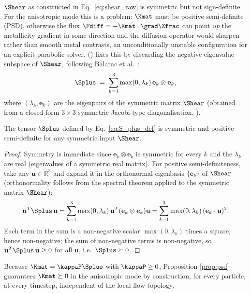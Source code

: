 $\Shear$ as constructed in Eq.~\eqref{eq:shear_raw} is symmetric but not
sign-definite. For the anisotropic mode this is a problem: $\Kmat$ must
be positive semi-definite (PSD), otherwise the flux $\Fdiff = -\Kmat
\cdot\grad\Zfrac$ can point \emph{up} the metallicity gradient in some
direction and the diffusion operator would sharpen rather than smooth
metal contrasts, an unconditionally unstable configuration for an
explicit parabolic solver. 
() fixes this by discarding the
negative-eigenvalue subspace of $\Shear$, following Balarac et
al.~\cite{Balarac2013}:
\begin{equation}
  \label{eq:S_plus_def}
  \Splus \;=\; \sum_{k=1}^{3} \max(0,\lambda_k)\, \mathbf e_k \otimes \mathbf e_k ,
\end{equation}
where $(\lambda_k, \mathbf e_k)$ are the eigenpairs of the symmetric
matrix $\Shear$ (obtained from a closed-form $3\times3$ symmetric
Jacobi-type diagonalisation, ).

\begin{proposition}
\label{prop:psd}
The tensor $\Splus$ defined by Eq.~\eqref{eq:S_plus_def} is symmetric
and positive semi-definite for any symmetric input $\Shear$.
\end{proposition}
\begin{proof}
Symmetry is immediate since $\mathbf e_k\otimes\mathbf e_k$ is symmetric
for every $k$ and the $\lambda_k$ are real (eigenvalues of a symmetric
real matrix). For positive semi-definiteness, take any
$\mathbf u \in \mathbb R^3$ and expand it in the orthonormal eigenbasis
$\{\mathbf e_k\}$ of $\Shear$ (orthonormality follows from the spectral
theorem applied to the symmetric matrix $\Shear$):
\begin{equation}
  \mathbf u^T \Splus\, \mathbf u
  = \sum_{k=1}^3 \max(0,\lambda_k)\, \mathbf u^T (\mathbf e_k \otimes \mathbf e_k) \mathbf u
  = \sum_{k=1}^3 \max(0,\lambda_k)\, (\mathbf e_k \cdot \mathbf u)^2 .
\end{equation}
Each term in the sum is a non-negative scalar $\max(0,\lambda_k)$ times a
square, hence non-negative; the sum of non-negative terms is
non-negative, so $\mathbf u^T \Splus\,\mathbf u \geq 0$ for all
$\mathbf u$, i.e.\ $\Splus \succeq 0$.
\end{proof}

Because $\Kmat = \kappaP \Splus$ with $\kappaP \geq 0$, Proposition
\ref{prop:psd} guarantees $\Kmat \succeq 0$ in the anisotropic mode by
construction, for every particle, at every timestep, independent of the
local flow topology.

